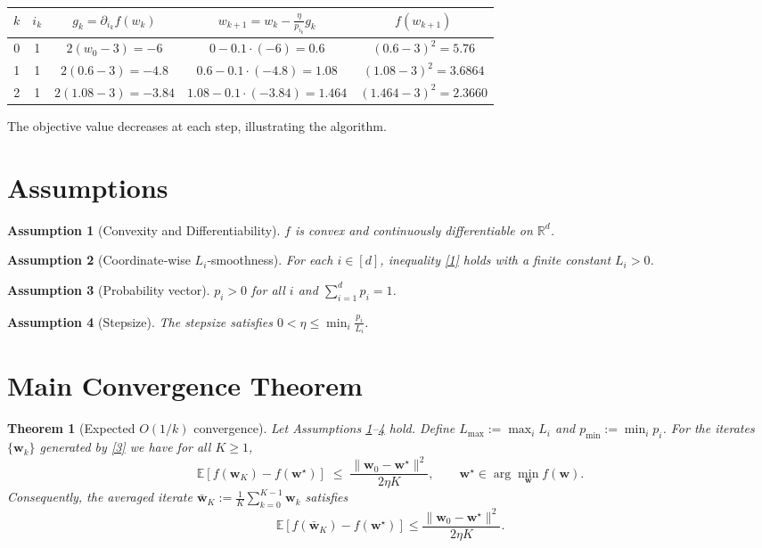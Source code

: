 \documentclass{article}
\newtheorem{theorem}{Theorem}
\newtheorem{assumption}{Assumption}
\newcommand{\E}{\mathbb{E}}
\newcommand{\R}{\mathbb{R}}
\newcommand{\w}{\mathbf{w}}
\begin{document}
\begin{center}
\begin{tabular}{c|c|c|c|c}
$k$ & $i_{k}$ & $g_{k}= \partial_{i_{k}}f(w_{k})$ & $w_{k+1}=w_{k}-\frac{\eta}{p_{i_{k}}}g_{k}$ & $f(w_{k+1})$\\ \hline
0 & 1 & $2(w_{0}-3)=-6$ & $0-0.1\cdot(-6)=0.6$ & $(0.6-3)^{2}=5.76$\\
1 & 1 & $2(0.6-3)=-4.8$ & $0.6-0.1\cdot(-4.8)=1.08$ & $(1.08-3)^{2}=3.6864$\\
2 & 1 & $2(1.08-3)=-3.84$ & $1.08-0.1\cdot(-3.84)=1.464$ & $(1.464-3)^{2}=2.3660$\\
\end{tabular}
\end{center}
The objective value decreases at each step, illustrating the algorithm.

\newpage
\section*{Assumptions}
\begin{assumption}[Convexity and Differentiability]\label{as:convex}
$f$ is convex and continuously differentiable on $\R^{d}$.
\end{assumption}
\begin{assumption}[Coordinate‑wise $L_{i}$‑smoothness]\label{as:smooth}
For each $i\in[d]$, inequality \eqref{1} holds with a finite constant $L_{i}>0$.
\end{assumption}
\begin{assumption}[Probability vector]\label{as:prob}
$p_{i}>0$ for all $i$ and $\sum_{i=1}^{d}p_{i}=1$.
\end{assumption}
\begin{assumption}[Stepsize]\label{as:stepsize}
The stepsize satisfies $0<\eta\le \min_{i}\frac{p_{i}}{L_{i}}$.
\end{assumption}

\section*{Main Convergence Theorem}
\begin{theorem}[Expected $O(1/k)$ convergence]\label{thm:rate}
Let Assumptions \ref{as:convex}–\ref{as:stepsize} hold.
Define $L_{\max}:=\max_{i}L_{i}$ and $p_{\min}:=\min_{i}p_{i}$.
For the iterates $\{\w_{k}\}$ generated by \eqref{3} we have for all $K\ge1$,
\[
\E\!\left[f(\w_{K})-f(\w^{\star})\right]
\;\le\;
\frac{\|\w_{0}-\w^{\star}\|^{2}}{2\eta K},
\qquad 
\w^{\star}\in\arg\min_{\w}f(\w).
\tag{4}
\]
Consequently, the averaged iterate $\bar{\w}_{K}:=\frac1K\sum_{k=0}^{K-1}\w_{k}$ satisfies
\[
\E\!\left[f(\bar{\w}_{K})-f(\w^{\star})\right]\le \frac{\|\w_{0}-\w^{\star}\|^{2}}{2\eta K}.
\]
\end{theorem}
\end{document}
